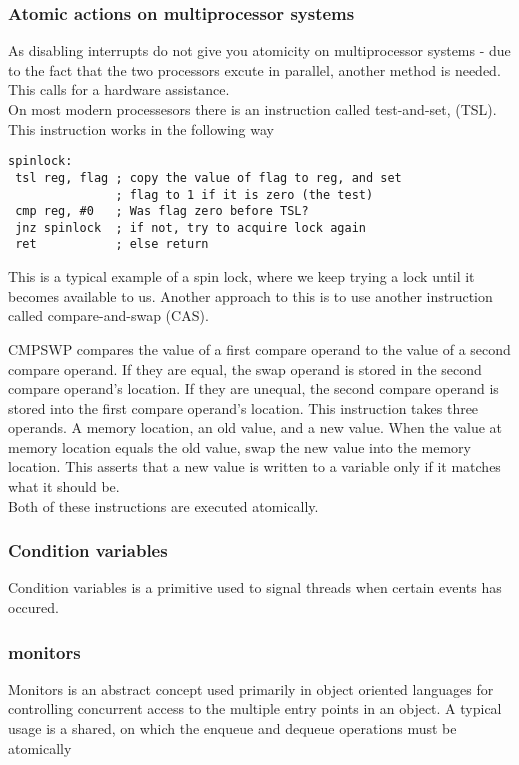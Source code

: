 \subsubsection{Atomic actions on multiprocessor systems}
As disabling interrupts do not give you atomicity on multiprocessor systems - due to the fact that the two processors excute in parallel, another method is needed. This calls for a hardware assistance.\\
On most modern processesors there is an instruction called test-and-set, (TSL). This instruction works in the following way
\begin{verbatim}
spinlock:
 tsl reg, flag ; copy the value of flag to reg, and set 
               ; flag to 1 if it is zero (the test)
 cmp reg, #0   ; Was flag zero before TSL?
 jnz spinlock  ; if not, try to acquire lock again
 ret           ; else return
\end{verbatim}
This is a typical example of a spin lock, where we keep trying a lock until it becomes available to us. Another approach to this is to use another instruction called compare-and-swap (CAS).

CMPSWP compares the value of a first compare operand to the value of a second compare operand. If they are equal, the swap operand is stored in the second compare operand's location. If they are unequal, the second compare operand is stored into the first compare operand's location. This instruction takes three operands. A memory location, an old value, and a new value. When the value at memory location equals the old value, swap the new value into the memory location. This asserts that a new value is written to a variable only if it matches what it should be.\\
Both of these instructions are executed atomically.

\subsubsection{Condition variables}
Condition variables is a primitive used to signal threads when certain events has occured.
\subsubsection{monitors}
Monitors is an abstract concept used primarily in object oriented languages for controlling concurrent access to the multiple entry points in an object. A typical usage is a shared, on which the enqueue and dequeue operations must be atomically

